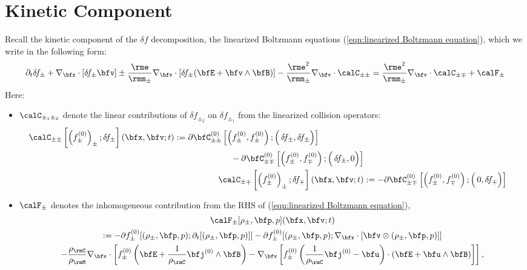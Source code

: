 \chapter{Kinetic Component}\label{cha:kinetic component}
    Recall the kinetic component of the $\delta\!f$ decomposition, the linearized Boltzmann equations (\ref{eqn:linearized Boltzmann equation}), which we write in the following form:
    \begin{equation}\label{eqn:linearized Boltzmann equation simplified}
        \partial_{t}\delta\!f_{\pm} + \nabla_{\bfx}\cdot[\delta\!f_{\pm}\bfv] \pm \frac{\rme}{\rmm_{\pm}}\nabla_{\bfv}\cdot[\delta\!f_{\pm}(\bfE + \bfv\wedge\bfB)] - \frac{\rme^{2}}{\rmm_{\pm}}\nabla_{\bfv}\cdot\calC_{\pm\pm}  =  \frac{\rme^{2}}{\rmm_{\pm}}\nabla_{\bfv}\cdot\calC_{\pm\mp} + \calF_{\pm}
    \end{equation}
    Here:
    \begin{itemize}
        \item  $\calC_{\pm_{1}\pm_{2}}$ denote the linear contributions of $\delta\!f_{\pm_{2}}$ on $\delta\!f_{\pm_{1}}$ from the linearized collision operators:
        \begin{align}
            \begin{split}
                \calC_{\pm\pm}\left[\left(f_{\pm}^{(0)}\right)_{\pm}; \delta\!f_{\pm}\right](\bfx, \bfv; t)  &:=  \partial\bfC_{\pm\pm}^{(0)}\left[\left(f_{\pm}^{(0)}, f_{\pm}^{(0)}\right); \left({\color{white} f_{\pm}^{(0)}}\!\!\!\!\!\!\!\!\!\delta\!f_{\pm}, \delta\!f_{\pm}\right)\right]  \\
                &\;\;\;\;\;\;\;\;\;\;\;\;\;\;\;\;\;\;\;\;\;\;\;\;- \partial\bfC_{\pm\mp}^{(0)}\left[\left(f_{\pm}^{(0)}, f_{\mp}^{(0)}\right); \left({\color{white} f_{\pm}^{(0)}}\!\!\!\!\!\!\!\!\!\delta\!f_{\pm}, 0 \right)\right]
            \end{split}  \label{eqn:linearized collision operator}  \\
            \calC_{\pm\mp}\left[\left(f_{\pm}^{(0)}\right)_{\pm}; \delta\!f_{\mp}\right](\bfx, \bfv; t)  &:=   - \partial\bfC_{\pm\mp}^{(0)}\left[\left(f_{\pm}^{(0)}, f_{\mp}^{(0)}\right); \left({\color{white} f_{\pm}^{(0)}}\!\!\!\!\!\!\!\!\!0, \delta\!f_{\mp} \right)\right]
        \end{align}
        \item  $\calF_{\pm}$ denotes the inhomogeneous contribution from the RHS of (\ref{eqn:linearized Boltzmann equation}),
        \begin{multline}
            \calF_{\pm}[\rho_{\pm}, \bfp, p](\bfx, \bfv; t)  \\
            :=  - \partial f_{\pm}^{(0)}[(\rho_{\pm}, \bfp, p); \partial_{t}[(\rho_{\pm}, \bfp, p)]] - \partial f_{\pm}^{(0)}[(\rho_{\pm}, \bfp, p); \nabla_{\bfx}\cdot[\bfv\otimes(\rho_{\pm}, \bfp, p)]]  \\
            - \frac{\rho_{\rmC}}{\rho_{\rmM}}\nabla_{\bfv}\cdot\left[f_{\pm}^{(0)}\left(\bfE + \frac{1}{\rho_{\rmC}}\bfj^{(0)}\wedge\bfB\right) - \nabla_{\bfv}\left[f_{\pm}^{(0)}\left(\frac{1}{\rho_{\rmC}}\bfj^{(0)} - \bfu\right)\cdot\left(\bfE + \bfu\wedge\bfB\right)\right]\right],
        \end{multline}
    \end{itemize}
